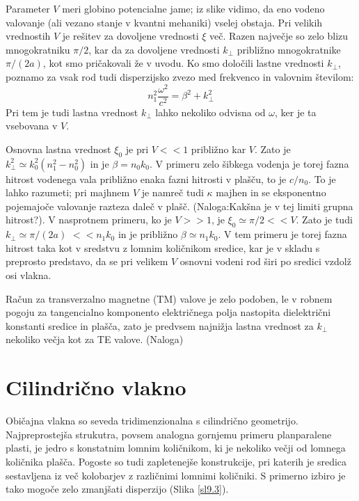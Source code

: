 Parameter $V$ meri globino potencialne jame; iz slike vidimo, da
eno vodeno valovanje (ali vezano stanje v kvantni mehaniki) vselej
obstaja. Pri velikih vrednostih $V$ je rešitev za dovoljene vrednosti
$\xi$ več. Razen največje so zelo blizu mnogokratniku $\pi/2$, kar
da za dovoljene vrednosti $k_{\perp}$ približno mnogokratnike $\pi/(2a)$,
kot smo pričakovali že v uvodu. Ko smo določili lastne vrednosti $k_{\perp}$,
poznamo za vsak rod tudi disperzijsko zvezo med frekvenco in valovnim
številom: 
\begin{equation}
n_{1}^{2}\frac{\omega^{2}}{c^{2}}=\beta^{2}+k_{\perp}^{2}\label{9.10}
\end{equation}
 Pri tem je tudi lastna vrednost $k_{\perp}$ lahko nekoliko odvisna
od $\omega$, ker je ta vsebovana v $V$.

Osnovna lastna vrednost $\xi_{0}$ je pri $V<<1$ približno kar $V$.
Zato je $k_{\perp}^{2}\simeq k_{0}^{2}(n_{1}^{2}-n_{0}^{2})$ in je
$\beta=n_{0}k_{0}$. V primeru zelo šibkega vodenja je torej fazna
hitrost vodenega vala približno enaka fazni hitrosti v plašču, to
je $c/n_{0}$. To je lahko razumeti; pri majhnem $V$ je namreč tudi
$\kappa$ majhen in se eksponentno pojemajoče valovanje razteza daleč
v plašč. (Naloga:Kakšna je v tej limiti grupna hitrost?). V nasprotnem
primeru, ko je $V>>1$, je $\xi_{0}\simeq\pi/2<<V$. Zato je tudi
$k_{\perp}\simeq\pi/(2a)$ $<<n_{1}k_{0}$ in je približno $\beta\simeq n_{1}k_{0}$.
V tem primeru je torej fazna hitrost taka kot v sredstvu z lomnim
količnikom sredice, kar je v skladu s preprosto predstavo, da se pri
velikem $V$ osnovni vodeni rod širi po sredici vzdolž osi vlakna.

Račun za transverzalno magnetne (TM) valove je zelo podoben, le v
robnem pogoju za tangencialno komponento električnega polja nastopita
dielektrični konstanti sredice in plašča, zato je predvsem najnižja
lastna vrednost za $k_{\perp}$ nekoliko večja kot za TE valove. (Naloga)


\section{Cilindrično vlakno}

Običajna vlakna so seveda tridimenzionalna s cilindrično geometrijo.
Najpreprostejša strukutra, povsem analogna gornjemu primeru planparalene
plasti, je jedro s konstatnim lomnim količnikom, ki je nekoliko večji
od lomnega količnika plašča. Pogoste so tudi zapletenejše konstrukcije,
pri katerih je sredica sestavljena iz več kolobarjev z različnimi
lomnimi količniki. S primerno izbiro je tako mogoče zelo zmanjšati
disperzijo (Slika \ref{sl9.3}).

